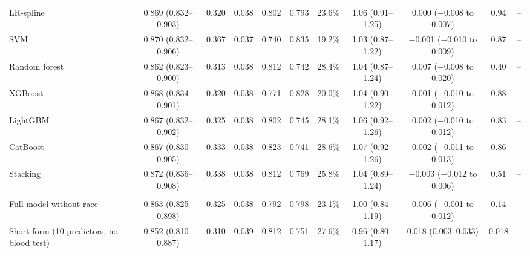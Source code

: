 \documentclass[11pt,a4paper]{article}
\begin{document}
\begin{table}[H]
{\begin{tabular}{lcccccccccc}
LR-spline & 0.869 (0.832--0.903) & 0.320 & 0.038 & 0.802 & 0.793 & 23.6\% & 1.06 (0.91--1.25) & 0.000 ($-$0.008 to 0.007) & 0.94 & -- \\
SVM & 0.870 (0.832--0.906) & 0.367 & 0.037 & 0.740 & 0.835 & 19.2\% & 1.03 (0.87--1.22) & $-$0.001 ($-$0.010 to 0.009) & 0.87 & -- \\
Random forest & 0.862 (0.823--0.900) & 0.313 & 0.038 & 0.812 & 0.742 & 28.4\% & 1.04 (0.87--1.24) & 0.007 ($-$0.008 to 0.020) & 0.40 & -- \\
XGBoost & 0.868 (0.834--0.901) & 0.320 & 0.038 & 0.771 & 0.828 & 20.0\% & 1.04 (0.90--1.22) & 0.001 ($-$0.010 to 0.012) & 0.88 & -- \\
LightGBM & 0.867 (0.832--0.902) & 0.325 & 0.038 & 0.802 & 0.745 & 28.1\% & 1.06 (0.92--1.26) & 0.002 ($-$0.010 to 0.012) & 0.83 & -- \\
CatBoost & 0.867 (0.830--0.905) & 0.333 & 0.038 & 0.823 & 0.741 & 28.6\% & 1.07 (0.92--1.26) & 0.002 ($-$0.011 to 0.013) & 0.86 & -- \\
Stacking & 0.872 (0.836--0.908) & 0.338 & 0.038 & 0.812 & 0.769 & 25.8\% & 1.04 (0.89--1.24) & $-$0.003 ($-$0.012 to 0.006) & 0.51 & -- \\
\addlinespace\multicolumn{11}{l}{\textit{Exploratory (not part of a comparison family)}} \\
Full model without race & 0.863 (0.825--0.898) & 0.325 & 0.038 & 0.792 & 0.798 & 23.1\% & 1.00 (0.84--1.19) & 0.006 ($-$0.001 to 0.012) & 0.14 & -- \\
Short form (10 predictors, no blood test) & 0.852 (0.810--0.887) & 0.310 & 0.039 & 0.812 & 0.751 & 27.6\% & 0.96 (0.80--1.17) & 0.018 (0.003--0.033) & 0.018 & -- \\
\bottomrule
\end{tabular}}
\end{table}
\end{document}
